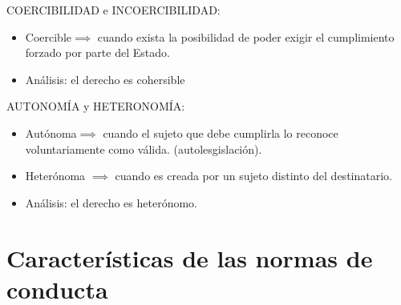 COERCIBILIDAD e INCOERCIBILIDAD:  
\begin{itemize}
    \item Coercible$\implies $ cuando exista la posibilidad de poder exigir el cumplimiento forzado por parte del Estado.   
    \item Análisis: el derecho es cohersible
\end{itemize}


AUTONOMÍA y HETERONOMÍA:  
\begin{itemize}
    \item Autónoma$\implies $ cuando el sujeto que debe cumplirla lo reconoce voluntariamente como válida. (autolesgislación).  
    \item Heterónoma $\implies $ cuando es creada por un sujeto distinto del destinatario.
    \item Análisis: el derecho es heterónomo.
\end{itemize}


\section{Características de las normas de conducta}
\begin{center}
\begin{tabular}{ | p{5cm} | p{5cm} | p{5cm} | }
 \hline
 \\
 \hline
\end{tabular}
\end{center}

